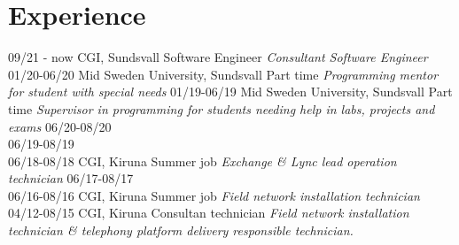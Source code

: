 \section{Experience}

\begin{entrylist}
  \entry
    {09/21 - now}
    {CGI, Sundsvall}
    {Software Engineer}
    {\emph{Consultant Software Engineer}}
  \entry
    {01/20-06/20}
    {Mid Sweden University, Sundsvall}
    {Part time}
    {\emph{Programming mentor for student with special needs}}
  \entry
    {01/19-06/19}
    {Mid Sweden University, Sundsvall}
    {Part time}
    {\emph{Supervisor in programming for students needing help in labs, projects and \\ exams}}
  \entry
    {06/20-08/20 \\ 06/19-08/19 \\ 06/18-08/18}
    {CGI, Kiruna}
    {Summer job}
    {\emph{Exchange \& Lync lead operation technician}}
  \entry
    {06/17-08/17 \\ 06/16-08/16}
    {CGI, Kiruna}
    {Summer job}
    {\emph{Field network installation technician}}
  \entry
    {04/12-08/15}
    {CGI, Kiruna}
    {Consultan technician}
    {\emph{Field network installation technician \& telephony platform delivery responsible technician.}}
\end{entrylist}

